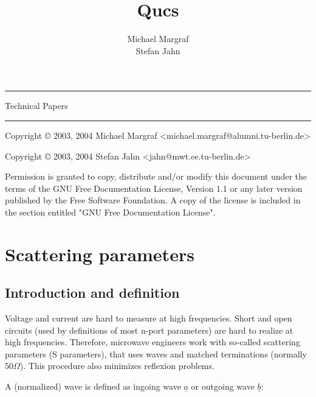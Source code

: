 \documentclass[10pt]{report}
\author{Michael Margraf \\ Stefan Jahn}
\title{Qucs}
\date{}
\makeatletter
\renewcommand{\maketitle}{\begin{titlepage}%
    \let\footnotesize\small
    \let\footnoterule\relax
    \parindent \z@
    \reset@font
    \null\vfil
    \vspace*{3cm}
    \begin{flushleft}
      \bf \huge \@title
    \end{flushleft}
    \par
    \hrule height 3pt
    \par
    \begin{flushright}
      \LARGE Technical Papers \par
    \end{flushright}
    \vskip 60\p@
    \vfill


    \begin{flushright}
      \Large \@author \par
    \end{flushright}

    \hrule height 3pt \par

\vspace*{24pt}

Copyright \copyright{} 2003, 2004 Michael Margraf 
\textless michael.margraf@alumni.tu-berlin.de\textgreater \par
Copyright \copyright{} 2003, 2004 Stefan Jahn 
\textless jahn@mwt.ee.tu-berlin.de\textgreater \par

\vspace*{12pt}

Permission is granted to copy, distribute and/or modify this document
under the terms of the GNU Free Documentation License, Version 1.1 or
any later version published by the Free Software Foundation.  A copy
of the license is included in the section entitled "GNU Free
Documentation License".

\vspace*{1cm}

  \end{titlepage}%
  \setcounter{footnote}{0}%
}
\makeatother
\begin{document}
\maketitle

\tableofcontents

\setlength{\parindent}{0pt}
\newpage

\chapter{Scattering parameters}

\section{Introduction and definition}

Voltage and current are hard to measure at high frequencies.  Short
and open circuits (used by definitions of most n-port parameters) are
hard to realize at high frequencies.  Therefore, microwave engineers
work with so-called scattering parameters (S parameters), that uses
waves and matched terminations (normally $50 \Omega$).  This procedure
also minimizes reflexion problems.

\addvspace{12pt}

A (normalized) wave is defined as ingoing wave $\underline{a}$ or
outgoing wave $\underline{b}$:
\end{document}

